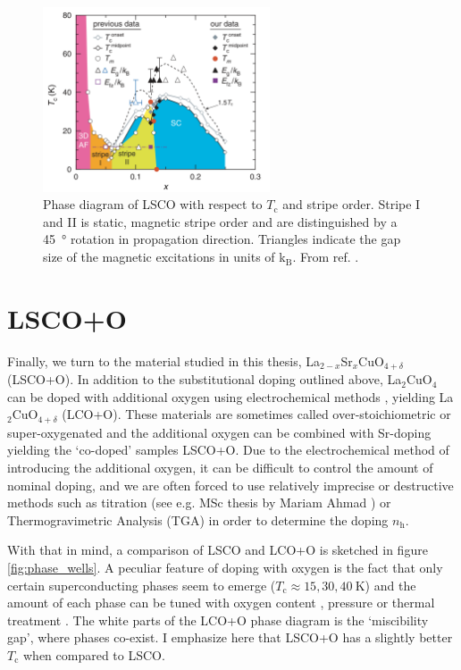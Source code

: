 \begin{figure}
    \centering
    \includegraphics[width=0.6\textwidth]{fig/intro/kofu_phase.png}
    \caption[kofu phase diagram]{Phase diagram of LSCO with respect to $T_\text{c}$ and stripe order. Stripe I and II is static, magnetic stripe order and are distinguished by a \SI{45}{\degree} rotation in propagation direction. Triangles indicate the gap size of the magnetic excitations in units of k$_\text{B}$. From ref. \cite{Kofu2009}.}
    \label{fig:kofu_phase}
\end{figure}

\section{LSCO+O}\label{sec:lscoo}
Finally, we turn to the material studied in this thesis, La$_{2-x}$Sr$_x$CuO$_{4+\delta}$ (LSCO+O). In addition to the substitutional doping outlined above, La$_2$CuO$_4$ can be doped with additional oxygen using electrochemical methods \cite{Blakeslee1998}, yielding La$_2$CuO$_{4+\delta}$ (LCO+O). These materials are sometimes called over-stoichiometric or super-oxygenated and the additional oxygen can be combined with Sr-doping yielding the `co-doped' samples  LSCO+O. Due to the electrochemical method of introducing the additional oxygen, it can be difficult to control the amount of nominal doping, and we are often forced to use relatively imprecise or destructive methods such as titration (see e.g. MSc thesis by Mariam Ahmad \cite{Ahmad2019MSc}) or Thermogravimetric Analysis (TGA) \cite{Karppinen1997} in order to determine the doping $n_\text{h}$.

With that in mind, a comparison of LSCO and LCO+O is sketched in figure \ref{fig:phase_wells}. A peculiar feature of doping with oxygen is the fact that only certain superconducting phases seem to emerge ($T_\text{c} \approx 15, 30, \SI{40}{\kelvin}$) and the amount of each phase can be tuned with oxygen content \cite{Liu2005}, pressure \cite{Lorenz2002} or thermal treatment \cite{Fratini2010}. The white parts of the LCO+O phase diagram is the `miscibility gap', where phases co-exist. I emphasize here that LSCO+O has a slightly better $T_\text{c}$ when compared to LSCO.

